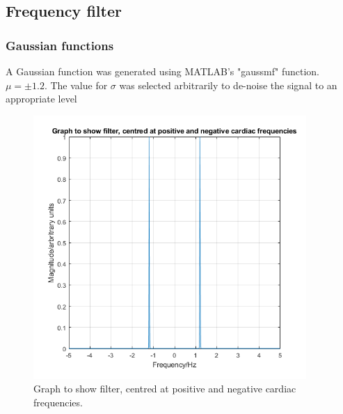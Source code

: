 \documentclass[11pt]{article}
\numberwithin{equation}{section}
\begin{document}
\subsection{Frequency filter}
\subsubsection{Gaussian functions}
A Gaussian function was generated using MATLAB's "gaussmf" function. $\mu = \pm1.2$. The value for $\sigma$ was selected arbitrarily to de-noise the signal to an appropriate level

\begin{figure}[H]
    \centering
    \includegraphics[height = 10cm]{./img/q304a.png}
    \caption{Graph to show filter, centred at positive and negative cardiac frequencies.}
    \label{fig:q304a}
\end{figure}
\end{document}
